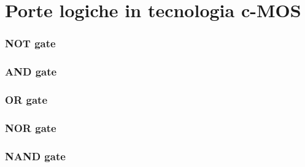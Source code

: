 \chapter{Porte logiche in tecnologia c-MOS}
\subsection{NOT gate}


\subsection{AND gate}


\subsection{OR gate}



\subsection{NOR gate}



\subsection{NAND gate}

